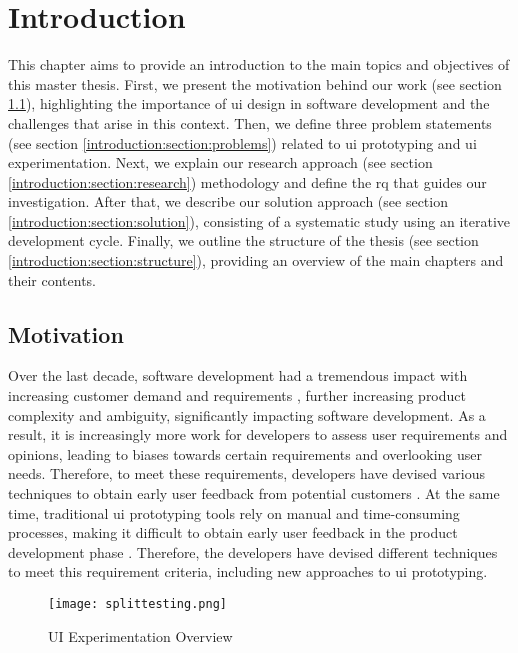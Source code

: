 
\chapter{Introduction}
\label{chap:introduction}
\ifpdf
    \graphicspath{{Chapters/Introduction/Figs/}{Chapters/Introduction/Figs/}{Chapters/Introduction/Figs/}}
\else
    \graphicspath{{Chapters/Introduction/Figs/}{Chapters/Introduction/Figs/}}
\fi
This chapter aims to provide an introduction to the main topics and objectives of this master thesis. 
First, we present the motivation behind our work (see section \ref{introduction:section:motivation}), highlighting the importance of \ac{ui} design in software development and the challenges that arise in this context.
Then, we define three problem statements (see section \ref{introduction:section:problems}) related to \ac{ui} prototyping and \ac{ui} experimentation. 
Next, we explain our research approach (see section \ref{introduction:section:research}) methodology and define the \ac{rq} that guides our investigation. 
After that, we describe our solution approach (see section \ref{introduction:section:solution}), consisting of a systematic study using an iterative development cycle. 
Finally, we outline the structure of the thesis (see section \ref{introduction:section:structure}), providing an overview of the main chapters and their contents.

\section{Motivation} %
\label{introduction:section:motivation}

Over the last decade, software development had a tremendous impact with increasing customer demand and requirements \cite{article:swdemand:ahmed}, further increasing product complexity and ambiguity, significantly impacting software development.
As a result, it is increasingly more work for developers to assess user requirements and opinions, leading to biases towards certain requirements and overlooking user needs.
Therefore, to meet these requirements, developers have devised various techniques to obtain early user feedback from potential customers \cite{misc:expperiments:split}. 
At the same time, traditional \ac{ui} prototyping tools rely on manual and time-consuming processes, making it difficult to obtain early user feedback in the product development phase \cite{paper:prototyping:luqi}.
Therefore, the developers have devised different techniques to meet this requirement criteria, including new approaches to \ac{ui} prototyping.
\begin{figure}[ht]
    \centering
    \texttt{[image: splittesting.png]}
    \caption[Split Testing]{UI Experimentation Overview \cite{misc:expperiments:split}}
    \label{intro:fig:splittesting}
\end{figure}

